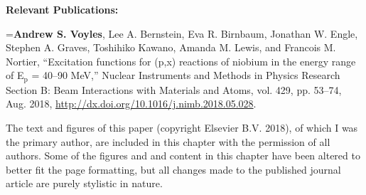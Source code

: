 \vspace{1cm}

\noindent \textbf{Relevant Publications:}

\vspace{0.5cm}




\hangindent=\parindent  \textbf{Andrew S. Voyles}, Lee A. Bernstein, Eva R. Birnbaum, Jonathan W. Engle,
Stephen A. Graves, Toshihiko Kawano, Amanda M. Lewis, and Francois M. Nortier, \enquote{Excitation functions for (p,x) reactions of niobium in the energy range of E$_{\text{p}}$ = 40--90 MeV,} Nuclear Instruments and Methods in Physics Research Section B: Beam Interactions with Materials and Atoms,  vol. 429, pp. 53--74, Aug. 2018, \url{http://dx.doi.org/10.1016/j.nimb.2018.05.028}. \cite{Voyles2018a} 





\vspace{0.5cm}




The text and figures of this paper (copyright Elsevier B.V. 2018), of which I was the primary author, are
included in this chapter with the permission of all authors. 
Some of the figures and and content in this chapter have been altered to better fit the page formatting, but all changes made to the published journal article are purely stylistic in nature.








